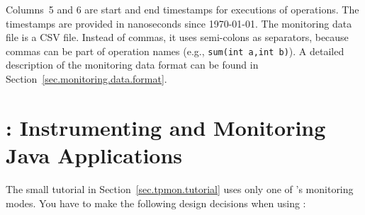 \documentclass[a4paper,12pt]{scrartcl}
\begin{document}
Columns~5 and 6 are start and end timestamps for executions of operations. The timestamps are provided in nanoseconds since 1970-01-01. The monitoring data file is a CSV file. Instead of commas, it uses semi-colons as separators, because commas can be part of operation names (e.g., \texttt{sum(int a,int b)}). A detailed description of the monitoring data format can be found in Section~\ref{sec.monitoring.data.format}.

\section{\tpmon{}: Instrumenting and Monitoring Java Applications}\label{sec.tpmon}

The small tutorial in Section~\ref{sec.tpmon.tutorial} uses only one of \tpmon{}'s monitoring modes. You have to make the following design decisions when using \tpmon{}:
\end{document}
